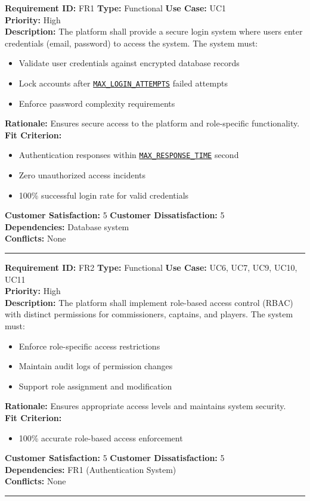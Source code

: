 \documentclass[12pt, titlepage]{article}
\begin{document}
\textbf{Requirement ID:} FR1 \quad \textbf{Type:} Functional \quad \textbf{Use Case:} UC1 \\
\textbf{Priority:} High \\
\textbf{Description:} The platform shall provide a secure login system where users enter credentials (email, password) to access the system. The system must:
\begin{itemize}
    \item Validate user credentials against encrypted database records
    \item Lock accounts after \hyperref[MAX_LOGIN_ATTEMPTS]{\texttt{MAX\_LOGIN\_ATTEMPTS}} failed attempts
    \item Enforce password complexity requirements
\end{itemize}
\textbf{Rationale:} Ensures secure access to the platform and role-specific functionality.\\
\textbf{Fit Criterion:} 
\begin{itemize}
    \item Authentication responses within \hyperref[MAX_RESPONSE_TIME]{\texttt{MAX\_RESPONSE\_TIME}} second
    \item Zero unauthorized access incidents
    \item 100\% successful login rate for valid credentials
\end{itemize}
\textbf{Customer Satisfaction:} 5 \quad\quad \textbf{Customer Dissatisfaction:} 5 \\
\textbf{Dependencies:} Database system\\
\textbf{Conflicts:} None\\
\noindent\rule{\textwidth}{1pt}

\textbf{Requirement ID:} FR2 \quad \textbf{Type:} Functional \quad \textbf{Use Case:} UC6, UC7, UC9, UC10, UC11 \\
\textbf{Priority:} High \\
\textbf{Description:} The platform shall implement role-based access control (RBAC) with distinct permissions for commissioners, captains, and players. The system must:
\begin{itemize}
    \item Enforce role-specific access restrictions
    \item Maintain audit logs of permission changes
    \item Support role assignment and modification
\end{itemize}
\textbf{Rationale:} Ensures appropriate access levels and maintains system security.\\
\textbf{Fit Criterion:} 
\begin{itemize}
    \item 100\% accurate role-based access enforcement
\end{itemize}
\textbf{Customer Satisfaction:} 5 \quad\quad \textbf{Customer Dissatisfaction:} 5 \\
\textbf{Dependencies:} FR1 (Authentication System)\\
\textbf{Conflicts:} None\\
\noindent\rule{\textwidth}{1pt}
\end{document}
